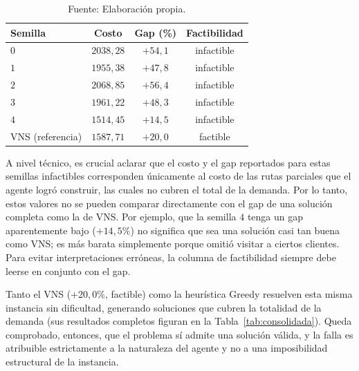 \begin{table}[H]
    \centering
    \caption{\label{tab:p02-detalle} Detalle multi-semilla sobre la instancia $p02$. Todas las semillas del agente resultan infactibles.}
    \caption*{Fuente: Elaboración propia.}
    \renewcommand{\arraystretch}{1.15}
    \setlength{\tabcolsep}{10pt}
    \begin{tabular}{@{}lccc@{}}
        \toprule
        \textbf{Semilla} & \textbf{Costo} & \textbf{Gap (\%)} & \textbf{Factibilidad} \\
        \midrule
        $0$ & $2038{,}28$ & $+54{,}1$ & infactible \\
        $1$ & $1955{,}38$ & $+47{,}8$ & infactible \\
        $2$ & $2068{,}85$ & $+56{,}4$ & infactible \\
        $3$ & $1961{,}22$ & $+48{,}3$ & infactible \\
        $4$ & $1514{,}45$ & $+14{,}5$ & infactible \\
        \midrule
        VNS (referencia) & $1587{,}71$ & $+20{,}0$ & factible \\
        \bottomrule
    \end{tabular}
\end{table}

A nivel técnico, es crucial aclarar que el costo y el gap reportados para estas semillas infactibles corresponden únicamente al costo de las rutas parciales que el agente logró construir, las cuales no cubren el total de la demanda. Por lo tanto, estos valores no se pueden comparar directamente con el gap de una solución completa como la de VNS. Por ejemplo, que la semilla $4$ tenga un gap aparentemente bajo ($+14{,}5\%$) no significa que sea una solución casi tan buena como VNS; es más barata simplemente porque omitió visitar a ciertos clientes. Para evitar interpretaciones erróneas, la columna de factibilidad siempre debe leerse en conjunto con el gap.

Tanto el VNS ($+20{,}0\%$, factible) como la heurística Greedy resuelven esta misma instancia sin dificultad, generando soluciones que cubren la totalidad de la demanda (sus resultados completos figuran en la Tabla~\ref{tab:consolidada}). Queda comprobado, entonces, que el problema sí admite una solución válida, y la falla es atribuible estrictamente a la naturaleza del agente y no a una imposibilidad estructural de la instancia.

